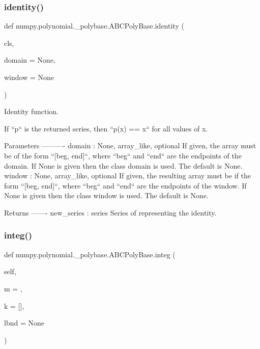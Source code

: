\subsubsection{\texorpdfstring{identity()}{identity()}}
{\footnotesize\ttfamily def numpy.\+polynomial.\+\_\+polybase.\+A\+B\+C\+Poly\+Base.\+identity (\begin{DoxyParamCaption}\item[{}]{cls,  }\item[{}]{domain = {\ttfamily None},  }\item[{}]{window = {\ttfamily None} }\end{DoxyParamCaption})}

\begin{DoxyVerb}Identity function.

If ``p`` is the returned series, then ``p(x) == x`` for all
values of x.

Parameters
----------
domain : {None, array_like}, optional
    If given, the array must be of the form ``[beg, end]``, where
    ``beg`` and ``end`` are the endpoints of the domain. If None is
    given then the class domain is used. The default is None.
window : {None, array_like}, optional
    If given, the resulting array must be if the form
    ``[beg, end]``, where ``beg`` and ``end`` are the endpoints of
    the window. If None is given then the class window is used. The
    default is None.

Returns
-------
new_series : series
     Series of representing the identity.\end{DoxyVerb}
 \mbox{\label{classnumpy_1_1polynomial_1_1__polybase_1_1ABCPolyBase_a34c8ec22e0970ead73ffe4117c8cf8b7}} 
\subsubsection{\texorpdfstring{integ()}{integ()}}
{\footnotesize\ttfamily def numpy.\+polynomial.\+\_\+polybase.\+A\+B\+C\+Poly\+Base.\+integ (\begin{DoxyParamCaption}\item[{}]{self,  }\item[{}]{m = {},  }\item[{}]{k = {\ttfamily \mbox{[}\mbox{]}},  }\item[{}]{lbnd = {\ttfamily None} }\end{DoxyParamCaption})}

